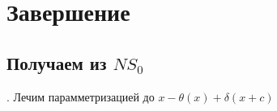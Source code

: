 \documentclass[main.tex]{subfiles}
\begin{document}
\section{Завершение}

\subsection{Получаем из $NS_0$}.
Лечим парамметризацией до $x-\theta(x) + \delta(x+c)$
\end{document}
